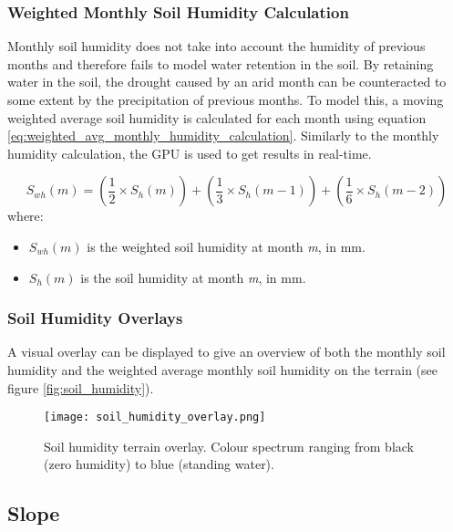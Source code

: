 \subsubsection{Weighted Monthly Soil Humidity Calculation}

Monthly soil humidity does not take into account the humidity of previous months and therefore fails to model water retention in the soil. By retaining water in the soil, the drought caused by an arid month can be counteracted to some extent by the precipitation of previous months. To model this, a moving weighted average soil humidity is calculated for each month using equation \ref{eq:weighted_avg_monthly_humidity_calculation}. Similarly to the monthly humidity calculation, the GPU is used to get results in real-time.

\begin{equation} \label{eq:weighted_avg_monthly_humidity_calculation}
	S_{wh}(m) =  (\frac{1}{2} \times S_{h}(m)) + (\frac{1}{3} \times S_{h}(m-1)) + (\frac{1}{6} \times S_{h}(m-2))
\end{equation}
where:
\begin{itemize}
\item \textit{$S_{wh}(m)$} is the weighted soil humidity at month \textit{m}, in mm.\\
\item \textit{$S_{h}(m)$} is the soil humidity at month \textit{m}, in mm. \\
\end{itemize}

\subsubsection{Soil Humidity Overlays}

A visual overlay can be displayed to give an overview of both the monthly soil humidity and the weighted average monthly soil humidity on the terrain (see figure \ref{fig:soil_humidity}).

\begin{figure}
\center
	\texttt{[image: soil\_humidity\_overlay.png]}
	\caption{ Soil humidity terrain overlay. Colour spectrum ranging from black (zero humidity) to blue (standing water). }
	\label{fig:soil_humidity overlay}
\end{figure}

\subsection{Slope}

